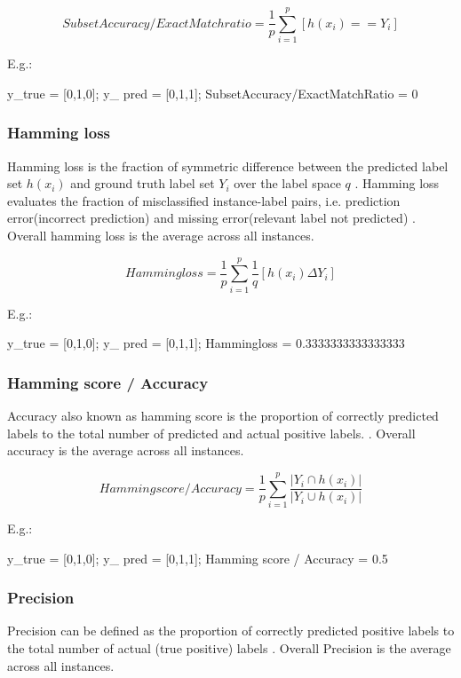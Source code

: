  $$Subset Accuracy / Exact Match ratio = \frac{1}{p}\sum_{i =1}^{p}[h(x_i) == Y_i]$$

E.g.: 

y\_true = [0,1,0]; 
y\_ pred = [0,1,1];  
SubsetAccuracy/ExactMatchRatio = 0
 
\subsubsection{Hamming loss}

Hamming loss is the fraction of  symmetric difference between the predicted label set $h(x_i)$ and ground truth label set $Y_i$ over the label space $q$ \cite{zhang2010multi}. Hamming loss evaluates the fraction of misclassified  instance-label pairs, i.e. prediction error(incorrect prediction) and missing error(relevant label not predicted) \cite{sorower2010literature}.  Overall hamming loss is the average across all instances.

 $$Hammingloss = \frac{1}{p}\sum_{i =1}^{p}\frac{1}{q}[h(x_i) \Delta Y_i]$$ \cite{zhang2010multi}
 

E.g.: 

y\_true = [0,1,0]; 
y\_ pred = [0,1,1];  
Hammingloss = 0.3333333333333333


\subsubsection{Hamming score / Accuracy}

 Accuracy also known as hamming score is the proportion of correctly predicted labels to the total number of predicted  and actual  positive labels. \cite{sorower2010literature}.  Overall accuracy is the average across all instances.

$$Hamming score / Accuracy = \frac{1}{p}\sum_{i =1}^{p}\frac{|Y_i \cap h(x_i)|}{|Y_i \cup h(x_i)|}$$ \cite{zhang2010multi}


E.g.: 

y\_true = [0,1,0]; 
y\_ pred = [0,1,1];  
Hamming score / Accuracy = 0.5

\subsubsection{Precision}

Precision can be defined as the proportion of correctly predicted positive labels to the total number of actual (true positive)
labels \cite{sorower2010literature}. Overall Precision is the average across all instances.

